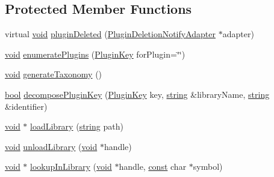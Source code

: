 \subsection*{Protected Member Functions}
\begin{DoxyCompactItemize}
\item 
virtual \hyperlink{sound_8c_ae35f5844602719cf66324f4de2a658b3}{void} \hyperlink{class_vamp_1_1_host_ext_1_1_plugin_loader_1_1_impl_ae0a6e1bf07a62eb6a34a1393bc3da26c}{plugin\+Deleted} (\hyperlink{class_vamp_1_1_host_ext_1_1_plugin_loader_1_1_impl_1_1_plugin_deletion_notify_adapter}{Plugin\+Deletion\+Notify\+Adapter} $\ast$adapter)
\item 
\hyperlink{sound_8c_ae35f5844602719cf66324f4de2a658b3}{void} \hyperlink{class_vamp_1_1_host_ext_1_1_plugin_loader_1_1_impl_a6fb71e4d0b4ff367ffef141c5e62763d}{enumerate\+Plugins} (\hyperlink{class_vamp_1_1_host_ext_1_1_plugin_loader_a473645bbb3ac5c1a0da2f0f482947c4d}{Plugin\+Key} for\+Plugin=\char`\"{}\char`\"{})
\item 
\hyperlink{sound_8c_ae35f5844602719cf66324f4de2a658b3}{void} \hyperlink{class_vamp_1_1_host_ext_1_1_plugin_loader_1_1_impl_a923d9ace30548d8f3cce58b4037ec9e4}{generate\+Taxonomy} ()
\item 
\hyperlink{mac_2config_2i386_2lib-src_2libsoxr_2soxr-config_8h_abb452686968e48b67397da5f97445f5b}{bool} \hyperlink{class_vamp_1_1_host_ext_1_1_plugin_loader_1_1_impl_ab06d720c0d53f908426ce244294d38ed}{decompose\+Plugin\+Key} (\hyperlink{class_vamp_1_1_host_ext_1_1_plugin_loader_a473645bbb3ac5c1a0da2f0f482947c4d}{Plugin\+Key} key, \hyperlink{test__lib_f_l_a_c_2format_8c_ab02026ad0de9fb6c1b4233deb0a00c75}{string} \&library\+Name, \hyperlink{test__lib_f_l_a_c_2format_8c_ab02026ad0de9fb6c1b4233deb0a00c75}{string} \&identifier)
\item 
\hyperlink{sound_8c_ae35f5844602719cf66324f4de2a658b3}{void} $\ast$ \hyperlink{class_vamp_1_1_host_ext_1_1_plugin_loader_1_1_impl_ac0618149e415b7fd8ad782f434070752}{load\+Library} (\hyperlink{test__lib_f_l_a_c_2format_8c_ab02026ad0de9fb6c1b4233deb0a00c75}{string} path)
\item 
\hyperlink{sound_8c_ae35f5844602719cf66324f4de2a658b3}{void} \hyperlink{class_vamp_1_1_host_ext_1_1_plugin_loader_1_1_impl_a6a93367036f896d505f553b616e1e7aa}{unload\+Library} (\hyperlink{sound_8c_ae35f5844602719cf66324f4de2a658b3}{void} $\ast$handle)
\item 
\hyperlink{sound_8c_ae35f5844602719cf66324f4de2a658b3}{void} $\ast$ \hyperlink{class_vamp_1_1_host_ext_1_1_plugin_loader_1_1_impl_aec71088ca89ba77f357bde8b37b807f8}{lookup\+In\+Library} (\hyperlink{sound_8c_ae35f5844602719cf66324f4de2a658b3}{void} $\ast$handle, \hyperlink{getopt1_8c_a2c212835823e3c54a8ab6d95c652660e}{const} char $\ast$symbol)

\end{DoxyCompactItemize}
